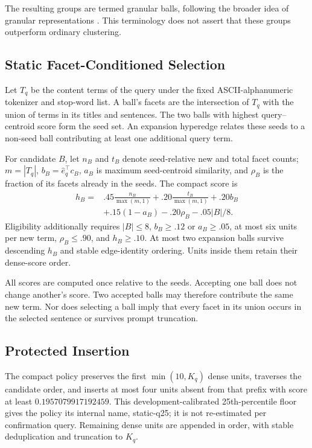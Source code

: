 \documentclass[11pt]{article}
\begin{document}
The resulting groups are termed granular balls, following the broader idea of
granular representations \citep{xia2019granularball}. This terminology does not
assert that these groups outperform ordinary clustering.

\subsection{Static Facet-Conditioned Selection}
Let $T_q$ be the content terms of the query under the fixed ASCII-alphanumeric
tokenizer and stop-word list. A ball's facets are the intersection of $T_q$
with the union of terms in its titles and sentences. The two balls with highest
query--centroid score form the seed set. An expansion hyperedge relates these
seeds to a non-seed ball contributing at least one additional query term.

For candidate $B$, let $n_B$ and $t_B$ denote seed-relative new and total facet
counts; $m=|T_q|$, $b_B=\hat e_q^\top c_B$, $a_B$ is maximum seed-centroid
similarity, and $\rho_B$ is the fraction of its facets already in the seeds.
The compact score is
\begin{equation}
\begin{split}
h_B={}&.45\frac{n_B}{\max(m,1)}+.20\frac{t_B}{\max(m,1)}
       +.20b_B\\
     &+.15(1-a_B)-.20\rho_B-.05|B|/8 .
\end{split}\label{eq:score}
\end{equation}
Eligibility additionally requires $|B|\leq8$, $b_B\geq.12$ or $a_B\geq.05$,
at most six units per new term, $\rho_B\leq.90$, and $h_B\geq.10$.
At most two expansion balls survive descending $h_B$ and stable edge-identity
ordering. Units inside them retain their dense-score order.

All scores are computed once relative to the seeds. Accepting one ball does
not change another's score. Two accepted balls may therefore contribute the
same new term. Nor does selecting a ball imply that every facet in its union
occurs in the selected sentence or survives prompt truncation.

\subsection{Protected Insertion}
The compact policy preserves the first $\min(10,K_q)$ dense units, traverses
the candidate order, and inserts at most four units absent from that prefix
with score at least $0.1957079917192459$. This development-calibrated
25th-percentile floor gives the policy its internal name, static-q25; it is not
re-estimated per confirmation query. Remaining dense units are appended in
order, with stable deduplication and truncation to $K_q$.
\end{document}

